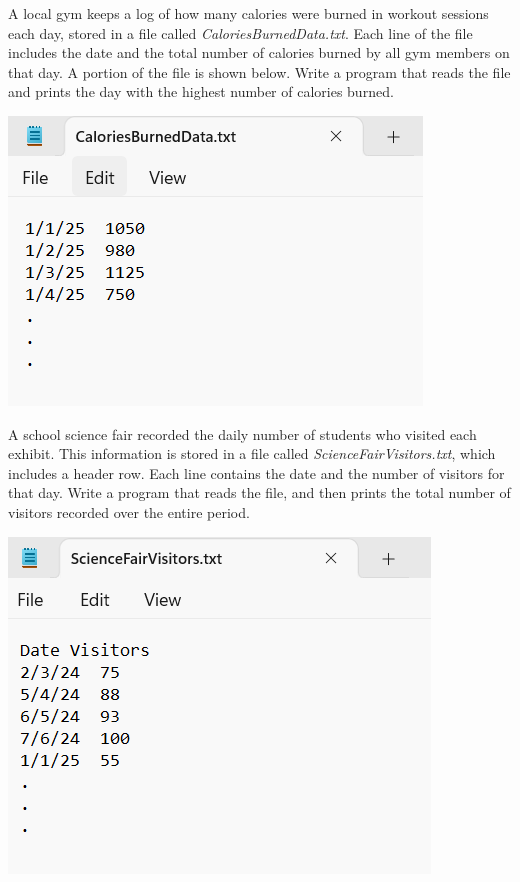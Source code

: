 	\item 
		A local gym keeps a log of how many calories were burned in workout sessions each day, stored in a file called \textit{CaloriesBurnedData.txt}.  
		Each line of the file includes the date and the total number of calories burned by all gym members on that day.  
		A portion of the file is shown below.  
		Write a program that reads the file and prints the day with the highest number of calories burned.
		
		\begin{flushright}
			\includegraphics[scale=.65]{imgs/CaloriesBurnedData.PNG}
		\end{flushright}


	\item 
		A school science fair recorded the daily number of students who visited each exhibit. 
		This information is stored in a file called \textit{ScienceFairVisitors.txt}, which includes 
		a header row. Each line contains the date and the number of visitors for that day. 
		Write a program that reads the file, and then prints the total number of visitors recorded 
		over the entire period.
		
		\begin{flushright}
			\includegraphics[scale=.65]{imgs/ScienceFairVisitorsData.PNG}
		\end{flushright}


